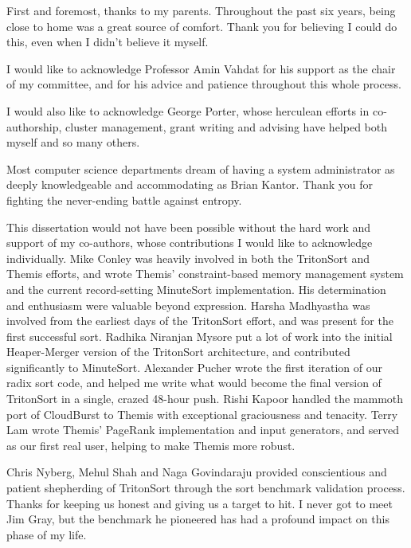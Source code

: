 \begin{acknowledgements}

First and foremost, thanks to my parents. Throughout the past six years, being
close to home was a great source of comfort. Thank you for believing I could do
this, even when I didn't believe it myself.

I would like to acknowledge Professor Amin Vahdat for his support as the chair
of my committee, and for his advice and patience throughout this whole process.

I would also like to acknowledge George Porter, whose herculean efforts in
co-authorship, cluster management, grant writing and advising have helped
both myself and so many others.

Most computer science departments dream of having a system administrator as
deeply knowledgeable and accommodating as Brian Kantor. Thank you for fighting
the never-ending battle against entropy.

This dissertation would not have been possible without the hard work and
support of my co-authors, whose contributions I would like to acknowledge
individually. Mike Conley was heavily involved in both the TritonSort and
Themis efforts, and wrote Themis' constraint-based memory management system and
the current record-setting MinuteSort implementation. His determination and
enthusiasm were valuable beyond expression.  Harsha Madhyastha was involved
from the earliest days of the TritonSort effort, and was present for the first
successful sort. Radhika Niranjan Mysore put a lot of work into the initial
Heaper-Merger version of the TritonSort architecture, and contributed
significantly to MinuteSort. Alexander Pucher wrote the first iteration of our
radix sort code, and helped me write what would become the final version of
TritonSort in a single, crazed 48-hour push. Rishi Kapoor handled the mammoth
port of CloudBurst to Themis with exceptional graciousness and tenacity. Terry
Lam wrote Themis' PageRank implementation and input generators, and served as
our first real user, helping to make Themis more robust.

Chris Nyberg, Mehul Shah and Naga Govindaraju provided conscientious and
patient shepherding of TritonSort through the sort benchmark validation
process. Thanks for keeping us honest and giving us a target to hit.  I never
got to meet Jim Gray, but the benchmark he pioneered has had a profound
impact on this phase of my life.


\end{acknowledgements}
